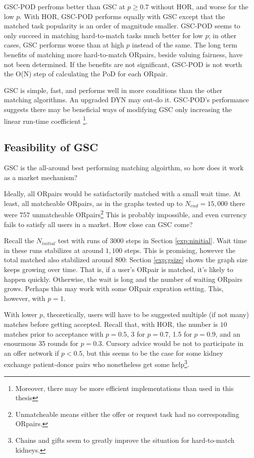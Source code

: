 \documentclass[main.tex]{subfiles}
\begin{document}
GSC-POD perfroms better than GSC at $p \geq 0.7$ without HOR, and worse for the low $p$. With HOR, GSC-POD performs equally with GSC except that the matched task popularity is an order of magnitude smaller. GSC-POD seems to only succeed in matching hard-to-match tasks much better for low $p$; in other cases, GSC performs worse than at high $p$ instead of the same. The long term benefits of matching more hard-to-match ORpairs, beside valuing fairness, have not been determined. If the benefits are not significant, GSC-POD is not worth the O(N) step of calculating the PoD for each ORpair.

GSC is simple, fast, and performs well in more conditions than the other matching algorithms. An upgraded DYN may out-do it. GSC-POD's performance suggests there may be beneficial ways of modifying GSC only increasing the linear run-time coefficient \footnote{Moreover, there may be more efficient implementations than used in this thesis}.

\subsection{Feasibility of GSC}
GSC is the all-around best performing matching algoirthm, so how does it work as a market mechanism?

Ideally, all ORpairs would be satisfactorily matched with a small wait time. At least, all matcheable ORpairs, as in the graphs tested up to $N_{end} = 15,000$ there were $757$ unmatcheable ORpairs\footnote{Unmatcheable means either the offer or request task had no corresponding ORpairs.} This is probably impossible, and even currency fails to satisfy all users in a market. How close can GSC come?

Recall the $N_{initial}$ test with runs of $3000$ steps in Section \ref{exp:ninitial}. Wait time in these runs stabilizes at around $1,100$ steps. This is promising, however the total matched also stabilized around $800$: Section \ref{exp:gsize} shows the graph size keeps growing over time. That is, if a user's ORpair is matched, it's likely to happen quickly. Otherwise, the wait is long and the number of waiting ORpairs grows. Perhaps this may work with some ORpair expration setting. This, however, with $p=1$.

With lower $p$, theoretically, users will have to be suggested multiple (if not many) matches before getting accepted. Recall that, with HOR, the number is $10$ matches prior to acceptance with $p=0.5$, 3 for $p=0.7$, 1.5 for $p=0.9$, and an enourmous 35 rounds for $p=0.3$. Cursory advice would be not to participate in an offer network if $p < 0.5$, but this seems to be the case for some kidney exchange patient-donor pairs who nonetheless get some help\footnote{Chains and gifts seem to greatly improve the situation for hard-to-match kidneys.}.
\end{document}

